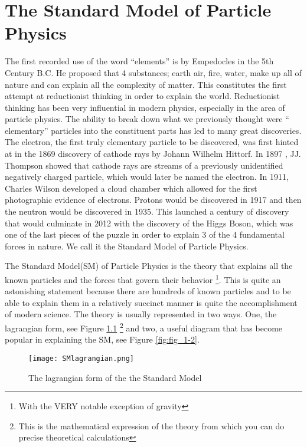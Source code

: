 \chapter{The Standard Model of Particle Physics}
\label{chap:intro}

The first recorded use of the word ``elements'' is by Empedocles in the 5th Century B.C. He proposed that 4 substances; earth air, fire, water, make up all of nature and can explain all the complexity of matter. 
This constitutes the first attempt at reductionist thinking in order to explain the world. Reductionist thinking has been very influential in modern physics, especially in the area of particle physics. 
The ability to break down what we previously thought were `` elementary'' particles into the constituent parts has led to many great discoveries. 
The electron, the first truly elementary particle to be discovered, was first hinted at in the 1869 discovery of cathode rays by Johann Wilhelm Hittorf. 
In 1897 , JJ. Thompson showed that cathode rays are streams of a previously unidentified negatively charged particle, which would later be named the electron. 
In 1911, Charles Wilson developed a cloud chamber which allowed for the first photographic evidence of electrons. Protons would be discovered in 1917 and then the neutron would be discovered in 1935. 
This launched a century of discovery that would culminate in 2012 with the discovery of the Higgs Boson, which was one of the last pieces of the puzzle in order to explain 3 of the 4 fundamental forces in nature. We call it the Standard Model of Particle Physics.

The Standard Model(SM) of Particle Physics is the theory that explains all the known particles and the forces that govern their behavior \footnote{With the VERY notable exception of gravity}. 
This is quite an astonishing statement because there are hundreds of known particles and to be able to explain them in a relatively succinct manner is quite the accomplishment of modern science. 
The theory is usually represented in two ways. One, the lagrangian form, see Figure \ref{fig:fig_1-1} \footnote{This is the mathematical expression of the theory from which you can do precise theoretical calculations} and two, a useful diagram that has become popular in explaining the SM, see Figure \ref{fig:fig_1-2}. 
\begin{figure} %
    \centering
    \texttt{[image: SMlagrangian.png]}
    \caption{The lagrangian form of the the Standard Model}
    \label{fig:fig_1-1}
 \end{figure}

